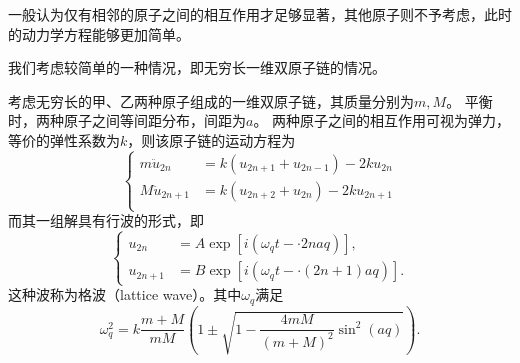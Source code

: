 一般认为仅有相邻的原子之间的相互作用才足够显著，其他原子则不予考虑，此时的动力学方程能够更加简单。

我们考虑较简单的一种情况，即无穷长一维双原子链的情况。

\begin{proposition}
    考虑无穷长的甲、乙两种原子组成的一维双原子链，其质量分别为$m,M$。
    平衡时，两种原子之间等间距分布，间距为$a$。
    两种原子之间的相互作用可视为弹力，等价的弹性系数为$k$，则该原子链的运动方程为
    \begin{equation}
        \left\{
            \begin{aligned}
                m \ddot u_{2n} &= k(u_{2n+1} + u_{2n-1}) - 2ku_{2n} \\
                M \ddot u_{2n+1} &= k(u_{2n+2} + u_{2n}) - 2ku_{2n+1} \\
            \end{aligned}
        \right.
    \end{equation}
    而其一组解具有行波的形式，即
    \begin{equation}
        \left\{
        \begin{aligned}
            u_{2n} &= A \exp[i(\omega_q t - \cdot 2na q)], \\
            u_{2n+1} &= B\exp[i(\omega_q t - \cdot (2n+1)a q)].
        \end{aligned}
        \right.
    \end{equation}
    这种波称为格波（lattice wave）。其中$\omega_q$满足
    \begin{equation}
        \omega_q^2 = k \frac{m+M}{mM} \left( 1 \pm \sqrt{1 - \frac{4mM}{(m+M)^2} \sin^2 ( a q)} \right).
    \end{equation}
\end{proposition}

